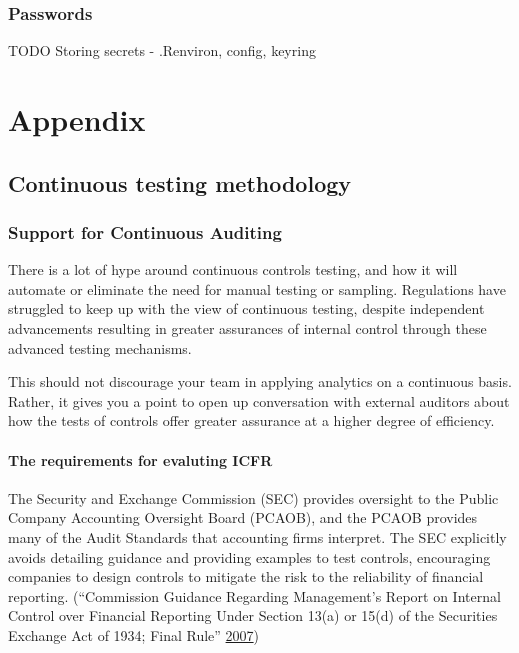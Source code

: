 \documentclass[
]{book}
\begin{document}
\hypertarget{passwords}{%
\section{Passwords}\label{passwords}}

TODO Storing secrets - .Renviron, config, keyring

\hypertarget{part-appendix}{%
\part{Appendix}\label{part-appendix}}

\hypertarget{appendixct}{%
\chapter{Continuous testing methodology}\label{appendixct}}

\hypertarget{support-for-continuous-auditing}{%
\section{Support for Continuous Auditing}\label{support-for-continuous-auditing}}

There is a lot of hype around continuous controls testing, and how it will automate or eliminate the need for manual testing or sampling. Regulations have struggled to keep up with the view of continuous testing, despite independent advancements resulting in greater assurances of internal control through these advanced testing mechanisms.

This should not discourage your team in applying analytics on a continuous basis. Rather, it gives you a point to open up conversation with external auditors about how the tests of controls offer greater assurance at a higher degree of efficiency.

\hypertarget{the-requirements-for-evaluting-icfr}{%
\subsection{The requirements for evaluting ICFR}\label{the-requirements-for-evaluting-icfr}}

The Security and Exchange Commission (SEC) provides oversight to the Public Company Accounting Oversight Board (PCAOB), and the PCAOB provides many of the Audit Standards that accounting firms interpret. The SEC explicitly avoids detailing guidance and providing examples to test controls, encouraging companies to design controls to mitigate the risk to the reliability of financial reporting. (``Commission Guidance Regarding Management's Report on Internal Control over Financial Reporting Under Section 13(a) or 15(d) of the Securities Exchange Act of 1934; Final Rule'' \protect\hyperlink{ref-sec-princples-based}{2007})
\end{document}
